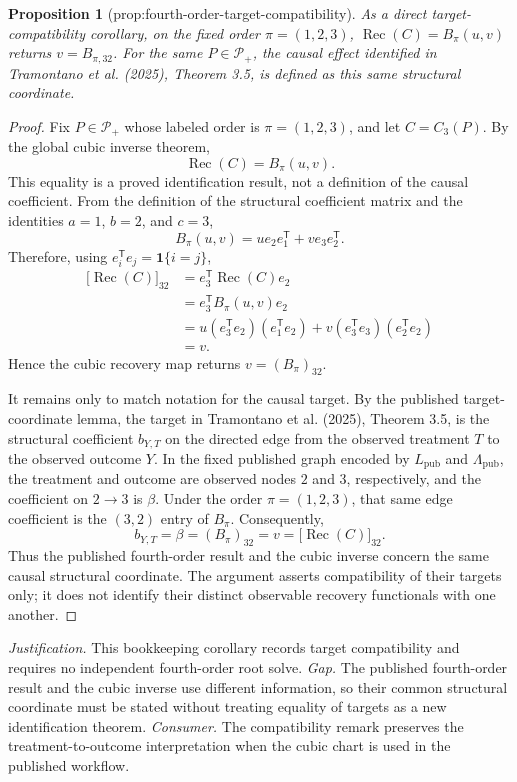 \documentclass{article}
\newtheorem{proposition}{Proposition}
\begin{document}
\begin{proposition}[prop:fourth-order-target-compatibility]\label{prop:fourth-order-target-compatibility}
As a direct target-compatibility corollary, on the fixed order \(\pi=(1,2,3)\), \(\operatorname{Rec}(C)=B_\pi(u,v)\) returns \(v=B_{\pi,32}\). For the same \(P\in\mathcal P_+\), the causal effect identified in Tramontano et al. (2025), Theorem 3.5, is defined as this same structural coordinate.
\end{proposition}
\begin{proof}
Fix \(P\in\mathcal P_+\) whose labeled order is \(\pi=(1,2,3)\), and let \(C=C_3(P)\).  By the global cubic inverse theorem,
\[
\operatorname{Rec}(C)=B_\pi(u,v).
\]
This equality is a proved identification result, not a definition of the causal coefficient.  From the definition of the structural coefficient matrix and the identities \(a=1\), \(b=2\), and \(c=3\),
\[
B_\pi(u,v)=u e_2e_1^{\mathsf T}+v e_3e_2^{\mathsf T}.
\]
Therefore, using \(e_i^{\mathsf T}e_j=\mathbf 1\{i=j\}\),
\[
\begin{aligned}
\bigl[\operatorname{Rec}(C)\bigr]_{32}
&=e_3^{\mathsf T}\operatorname{Rec}(C)e_2\\
&=e_3^{\mathsf T}B_\pi(u,v)e_2\\
&=u(e_3^{\mathsf T}e_2)(e_1^{\mathsf T}e_2)
  +v(e_3^{\mathsf T}e_3)(e_2^{\mathsf T}e_2)\\
&=v.
\end{aligned}
\]
Hence the cubic recovery map returns \(v=(B_\pi)_{32}\).

It remains only to match notation for the causal target.  By the published target-coordinate lemma, the target in Tramontano et al. (2025), Theorem 3.5, is the structural coefficient \(b_{Y,T}\) on the directed edge from the observed treatment \(T\) to the observed outcome \(Y\).  In the fixed published graph encoded by \(L_{\mathrm{pub}}\) and \(\Lambda_{\mathrm{pub}}\), the treatment and outcome are observed nodes \(2\) and \(3\), respectively, and the coefficient on \(2\to3\) is \(\beta\).  Under the order \(\pi=(1,2,3)\), that same edge coefficient is the \((3,2)\) entry of \(B_\pi\).  Consequently,
\[
b_{Y,T}=\beta=(B_\pi)_{32}=v
=\bigl[\operatorname{Rec}(C)\bigr]_{32}.
\]
Thus the published fourth-order result and the cubic inverse concern the same causal structural coordinate.  The argument asserts compatibility of their targets only; it does not identify their distinct observable recovery functionals with one another.
\end{proof}
\par\smallskip\noindent \textit{Justification.} This bookkeeping corollary records target compatibility and requires no independent fourth-order root solve. \textit{Gap.} The published fourth-order result and the cubic inverse use different information, so their common structural coordinate must be stated without treating equality of targets as a new identification theorem. \textit{Consumer.} The compatibility remark preserves the treatment-to-outcome interpretation when the cubic chart is used in the published workflow.
\end{document}
